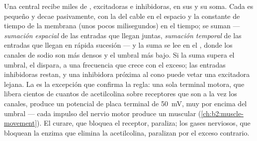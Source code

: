 \begin{proposition}\label{prop:b2:neurons-synapses:integration}
Una  central recibe miles de , excitadoras e inhibidoras,
en sus  y su soma. Cada  es pequeño y
decae pasivamente, con la  del cable en el espacio y
la constante de tiempo de la membrana (unos pocos milisegundos) en el
tiempo; se suman --- \emph{sumación espacial} de las entradas que llegan
juntas, \emph{sumación temporal} de las entradas que llegan en rápida
sucesión --- y la suma se lee en el \emph{}, donde los
canales de sodio son más densos y el umbral más bajo. Si la suma supera el
umbral, el  dispara, a una frecuencia que crece con el exceso; las
entradas inhibidoras restan, y una  inhibidora próxima al cono
puede vetar una excitadora lejana. La
 es la excepción que confirma la regla: una sola
terminal motora, que libera cientos de cuantos de acetilcolina sobre
receptores que son a la vez los canales, produce un potencial de placa
terminal de \qty{50}{mV}, muy por encima del umbral --- cada impulso del
nervio motor produce un  muscular
(\cref{ch:b2:muscle-movement}). El curare, que bloquea el receptor,
paraliza; los gases nerviosos, que bloquean la enzima que elimina la
acetilcolina, paralizan por el exceso contrario.
\end{proposition}

